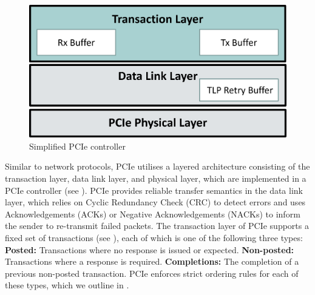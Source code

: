 \begin{figure}[!htb]
    \centering
    \includegraphics[width=\columnwidth]{figures/interconnect-sc/pcie-controller.png}
    \caption{Simplified PCIe controller}
    \label{fig:pcie-controller}
\end{figure}

Similar to network protocols, PCIe utilises a layered architecture consisting of the transaction layer, data link layer, and physical layer, which are implemented in a PCIe controller (see ).
PCIe provides reliable transfer semantics in the data link layer, which relies on Cyclic Redundancy Check (CRC) to detect errors and uses Acknowledgements (ACKs) or Negative Acknowledgements (NACKs) to inform the sender to re-transmit failed packets.
The transaction layer of PCIe supports a fixed set of transactions (see ), each of which is one of the following three types:
\textbf{Posted:} Transactions where no response is issued or expected. 
\textbf{Non-posted:} Transactions where a response is required. 
\textbf{Completions:} The completion of a previous non-posted transaction.
PCIe enforces strict ordering rules for each of these types, which we outline in .

